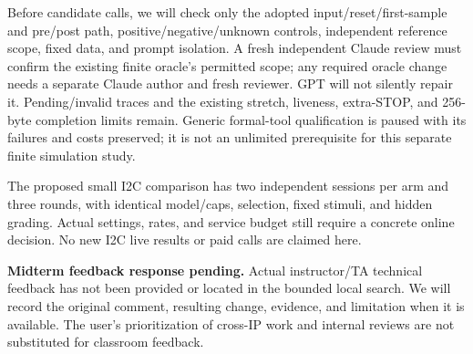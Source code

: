 \documentclass[conference,10pt,letterpaper]{IEEEtran}
\begin{document}
Before candidate calls, we will check only the adopted input/reset/first-sample
and pre/post path, positive/negative/unknown controls, independent reference
scope, fixed data, and prompt isolation. A fresh independent Claude review must
confirm the existing finite oracle's permitted scope; any required oracle
change needs a separate Claude author and fresh reviewer. GPT will not silently
repair it. Pending/invalid traces and the existing stretch, liveness, extra-STOP,
and 256-byte completion limits remain. Generic formal-tool qualification is
paused with its failures and costs preserved; it is not an unlimited prerequisite
for this separate finite simulation study.

The proposed small I2C comparison has two independent sessions per arm and three
rounds, with identical model/caps, selection, fixed stimuli, and hidden grading.
Actual settings, rates, and service budget still require a concrete online
decision. No new I2C live results or paid calls are claimed here.

\textbf{Midterm feedback response pending.} Actual instructor/TA technical
feedback has not been provided or located in the bounded local search. We will
record the original comment, resulting change, evidence, and limitation when it
is available. The user's prioritization of cross-IP work and internal reviews
are not substituted for classroom feedback.
\end{document}
